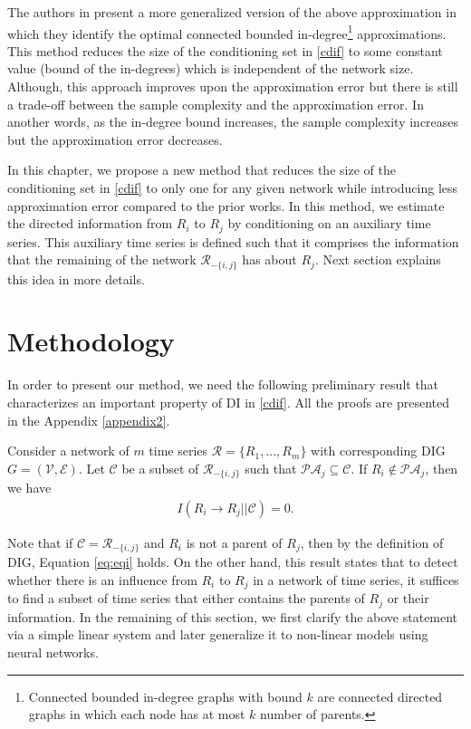 The authors in \citet{quinn2015bounded} present a more generalized version of the above approximation in which they identify the optimal connected bounded in-degree\footnote{Connected bounded in-degree graphs with bound $k$ are connected directed graphs in which each node has at most $k$ number of parents.} approximations.  
This method reduces the size of the conditioning set in \eqref{cdif} to some constant value (bound of the in-degrees) which is independent of the network size. 
Although, this approach improves upon the approximation error but there is still a trade-off between the sample complexity and the approximation error. In another words, as the in-degree bound increases, the sample complexity increases but the approximation error decreases.


In this chapter, we propose a new method that reduces the size of the conditioning set in \eqref{cdif} to only one for any given network while introducing less approximation error compared to the prior works. 
In this method, we estimate the directed information from $R_i$ to $R_j$ by conditioning on an auxiliary time series. This auxiliary time series is defined such that it comprises the information that the remaining of the network $\mathcal{R}_{-\{i,j\}}$ has about $R_j$.
Next section explains this idea in more details.

\clearpage

\section{Methodology}\label{sec:method}

In order to present our method, we need the following preliminary result that characterizes an important property of DI in \eqref{cdif}. All the proofs are presented in the Appendix \ref{appendix2}.

\begin{lemma}\label{lemma:small}
Consider a network of $m$ time series $\mathcal{R}=\{R_1,...,R_m\}$ with corresponding DIG $G=(\mathcal{V},\mathcal{E})$. Let $\mathcal{C}$ be a subset of $\mathcal{R}_{-\{i,j\}}$ such that $\mathcal{PA}_j\subseteq \mathcal{C}$. If $R_i\not\in\mathcal{PA}_j$, then we have
\begin{align}\label{eq:eqi}
I(R_i\rightarrow R_j||\mathcal{C})=0.
\end{align}
\end{lemma}
Note that if $\mathcal{C}=\mathcal{R}_{-\{i,j\}}$ and $R_i$ is not a parent of $R_j$, then by the definition of DIG, Equation  \eqref{eq:eqi} holds.
On the other hand, this result states that to detect whether there is an influence from $R_i$ to $R_j$ in a network of time series, it suffices to find a subset of time series that either contains the parents of $R_j$ or their information.
In the remaining of this section, we first clarify the above statement via a simple linear system and later generalize it to non-linear models using neural networks.

